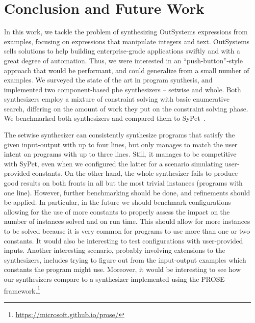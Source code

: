 \section{Conclusion and Future Work}
\label{sec:conclusion}

In this work, we tackle the problem of synthesizing OutSystems expressions from
examples, focusing on expressions that manipulate integers and text.
OutSystems sells solutions to help building enterprise-grade applications
swiftly and with a great degree of automation.
Thus, we were interested in an ``push-button''-style approach that would be
performant, and could generalize from a small number of examples.
We surveyed the state of the art in program synthesis, and implemented two
component-based \gls{pbe} synthesizers -- setwise and whole.
Both synthesizers employ a mixture of constraint solving with basic enumerative
search, differing on the amount of work they put on the constraint solving
phase.
We benchmarked both synthesizers and compared them to SyPet~\cite{Feng:2017:CSC}.

The setwise synthesizer can consistently synthesize programs that satisfy the
given input-output with up to four lines, but only manages to match the user
intent on programs with up to three lines.
Still, it manages to be competitive with SyPet, even when we configured the
latter for a scenario simulating user-provided constants.
On the other hand, the whole synthesizer fails to produce good results on both
fronts in all but the most trivial instances (programs with one line).
However, further benchmarking should be done, and refinements should be applied.
In particular, in the future we should benchmark configurations allowing for the
use of more constants to properly assess the impact on the number of instances
solved and on run time.
This should allow for more instances to be solved because it is very common for
programs to use more than one or two constants.
It would also be interesting to test configurations with user-provided inputs.
Another interesting scenario, probably involving extensions to the synthesizers,
includes trying to figure out from the input-output examples which constants the
program might use.
Moreover, it would be interesting to see how our synthesizers compare to a
synthesizer implemented using the PROSE
framework.\footnote{\url{https://microsoft.github.io/prose/}}

